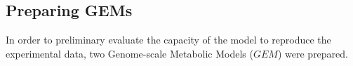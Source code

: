 	\subsection{Preparing GEMs} 
	
	In order to preliminary evaluate the capacity of the model to reproduce the experimental data, two Genome-scale Metabolic Models ($GEM$) were prepared.
	
		
		